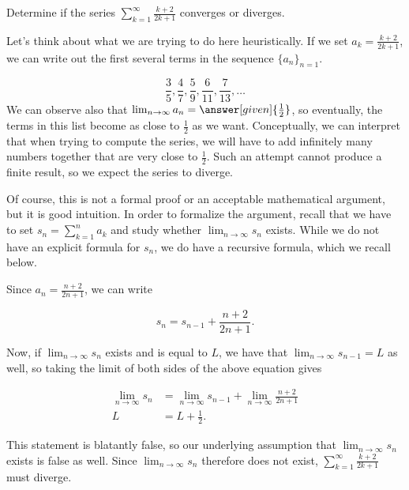 \documentclass{ximera}
\begin{document}
\begin{example}
Determine if the series $\sum_{k=1}^{\infty} \frac{k+2}{2k+1}$ converges or diverges.  

\begin{explanation}
Let's think about what we are trying to do here heuristically.  If we set $a_k =  \frac{k+2}{2k+1}$, we can write out the first several terms in the sequence $\{a_n\}_{n=1}$.

\[
\frac{3}{5}, \frac{4}{7}, \frac{5}{9}, \frac{6}{11},\frac{7}{13}, \ldots
\]
We can observe also that $\lim_{n \to \infty} a_n = \answer[given]{\frac{1}{2}}$, so eventually, the terms in this list become as close to $\frac{1}{2}$ as we want.  Conceptually, we can interpret that when trying to compute the series, we will have to add infinitely many numbers together that are very close to $\frac{1}{2}$.  Such an attempt cannot produce a finite result, so we expect the series to diverge.

Of course, this is not a formal proof or an acceptable mathematical argument, but it is good intuition.  In order to formalize the argument, recall that we have to set $s_n = \sum_{k=1}^n a_k$ and study whether $\lim_{n \to \infty} s_n$ exists.  While we do not have an explicit formula for $s_n$, we do have a recursive formula, which we recall below. 

\begin{image}
  \end{image}

Since $a_n = \frac{n+2}{2n+1}$, we can write

\[
s_n = s_{n-1}+\frac{n+2}{2n+1}.
\] 

Now, if $\lim_{n \to \infty} s_n$ exists and is equal to $L$, we have that $\lim_{n \to \infty} s_{n-1}=L$ as well, so taking the limit of both sides of the above equation gives

\begin{align*}
\lim_{n \to \infty} s_n &= \lim_{n \to \infty} s_{n-1}+ \lim_{n \to \infty} \frac{n+2}{2n+1} \\
L &= L +\frac{1}{2}.
\end{align*} 

This statement is blatantly false, so our underlying assumption that $\lim_{n \to \infty} s_n$ exists is false as well.  Since $\lim_{n \to \infty} s_n$ therefore does not exist,  $\sum_{k=1}^{\infty} \frac{k+2}{2k+1}$ must diverge.
\end{explanation}
\end{example}
\end{document}
